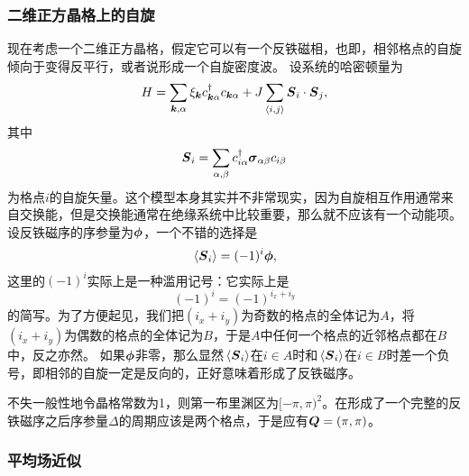 \documentclass[hyperref, UTF8, a4paper]{ctexart}
\newcommand*{\pair}[1]{\langle #1 \rangle}
\begin{document}
\subsubsection{二维正方晶格上的自旋}

现在考虑一个二维正方晶格，假定它可以有一个反铁磁相，也即，相邻格点的自旋倾向于变得反平行，或者说形成一个自旋密度波。
设系统的哈密顿量为
\begin{equation}
    {H} = \sum_{\vb*{k}, \alpha} \xi_{\vb*{k}} {c}_{\vb*{k} \alpha}^\dagger {c}_{\vb*{k} \alpha} + J \sum_{\pair{i, j}} {\vb*{S}}_i \cdot {\vb*{S}}_j,
    \label{eq:2dim-square-spin}
\end{equation}
其中
\begin{equation}
    {\vb*{S}}_i = \sum_{\alpha, \beta} {c}^\dagger_{i \alpha} \vb*{\sigma}_{\alpha \beta} {c}_{i \beta}
    \label{eq:spin-wave-order-parameter}
\end{equation}
为格点$i$的自旋矢量。这个模型本身其实并不非常现实，因为自旋相互作用通常来自交换能，但是交换能通常在绝缘系统中比较重要，那么就不应该有一个动能项。
设反铁磁序的序参量为$\vb*{\phi}$，一个不错的选择是
\begin{equation}
    \expval*{{\vb*{S}}_i} = (-1)^i \vb*{\phi},
\end{equation}
这里的$(-1)^i$实际上是一种滥用记号：它实际上是
\[
    (-1)^i = (-1)^{i_x + i_y}
\]
的简写。为了方便起见，我们把$(i_x + i_y)$为奇数的格点的全体记为$A$，将$(i_x + i_y)$为偶数的格点的全体记为$B$，于是$A$中任何一个格点的近邻格点都在$B$中，反之亦然。
如果$\vb*{\phi}$非零，那么显然$\expval*{{\vb*{S}}_i}$在$i \in A$时和$\expval*{{\vb*{S}}_i}$在$i \in B$时差一个负号，即相邻的自旋一定是反向的，正好意味着形成了反铁磁序。

不失一般性地令晶格常数为1，则第一布里渊区为$[-\pi, \pi)^2$。在形成了一个完整的反铁磁序之后序参量$\Delta$的周期应该是两个格点，于是应有$\vb*{Q}=(\pi, \pi)$。

\subsubsection{平均场近似}
\end{document}
